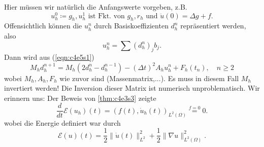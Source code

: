 \documentclass[../skript.tex]{subfiles}
\begin{document}
Hier müssen wir natürlich die Anfangswerte vorgeben, z.B.
\begin{equation}\label{eqn:c4e5s2}
	u_h^0 \coloneqq g_h, u_h^1\text{ ist Fkt. von }g_h,r_h\text{ und }\ddot{u}(0) = \Delta g+f.
\end{equation}
Offensichtlich können die $u_h^n$ durch Basiskoeffizienten $d_h^n$ repräsentiert werden, also
\[
	u_h^n = \sum (d_h^n)_j b_j.
\]
Dann wird aus (\ref{eqn:c4e5s1}) 
\[
	M_h d_h^{n+1} = M_h (2d_h^n - d_h^{n-1}) - (\Delta t)^2A_h u_h^n + F_h(t_n),\quad n\geq 2
\]
wobei $M_h,A_h,F_h$ wie zuvor sind (Massenmatrix,...). Es muss in diesem Fall $M_h$ invertiert werden! Die Inversion dieser Matrix ist numerisch unproblematisch.\newline\newline\noindent
Wir erinnern uns: Der Beweis von \cref{thm:c4e3s3} zeigte
\[
    \frac{d}{dt} \mathcal{E}(u_h)(t) = (f(t),\dot{u}_h(t))_{L^2(\Omega)} \overset{f=0}= 0.
\]
wobei die Energie definiert war durch
\[
	\mathcal{E}(u)(t) = \frac{1}{2} \|\dot{u}(t)\|_{L^2}^2 + \frac{1}{2} \|\nabla u\|_{L^2(\Omega)}^2.
\]
\end{document}
